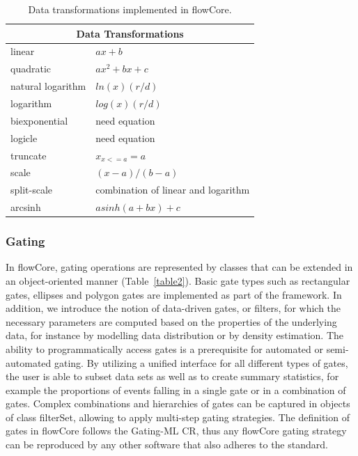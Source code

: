 \documentclass[12pt]{article}
\begin{document}
\begin{table}[ht]
\begin{center}
\begin{tabular}{|l|l|}
\hline
\multicolumn{2}{|c|}{Data Transformations} \\
\hline
linear & $ax + b$ \\
quadratic & $ax^2 + bx + c$ \\
natural logarithm & $ln(x)(r/d)$ \\
logarithm & $log(x)(r/d)$ \\
biexponential & need equation \\
logicle& need equation \\
truncate & $x_{x<=a} = a$ \\
scale & $(x-a)/(b-a)$ \\
split-scale & combination of linear and logarithm \\
arcsinh & $asinh(a + bx)+c$ \\
\hline
\end{tabular}
\caption{\label{table1}Data transformations implemented in flowCore.}
\end{center}
\end{table}

\subsubsection*{Gating}

In flowCore, gating operations are represented by classes that can be
extended in an object-oriented manner (Table~\ref{table2}). Basic gate
types such as rectangular gates, ellipses and polygon gates are
implemented as part of the framework. In addition, we introduce the
notion of data-driven gates, or filters, for which the necessary
parameters are computed based on the properties of the underlying
data, for instance by modelling data distribution or by density
estimation. The ability to programmatically access gates is a
prerequisite for automated or semi-automated gating. By utilizing a
unified interface for all different types of gates, the user is able
to subset data sets as well as to create summary statistics, for
example the proportions of events falling in a single gate or in a
combination of gates. Complex combinations and hierarchies of gates
can be captured in objects of class filterSet, allowing to apply
multi-step gating strategies. The definition of gates in flowCore
follows the Gating-ML CR, thus any flowCore gating strategy can be
reproduced by any other software that also adheres to the standard.
\end{document}
